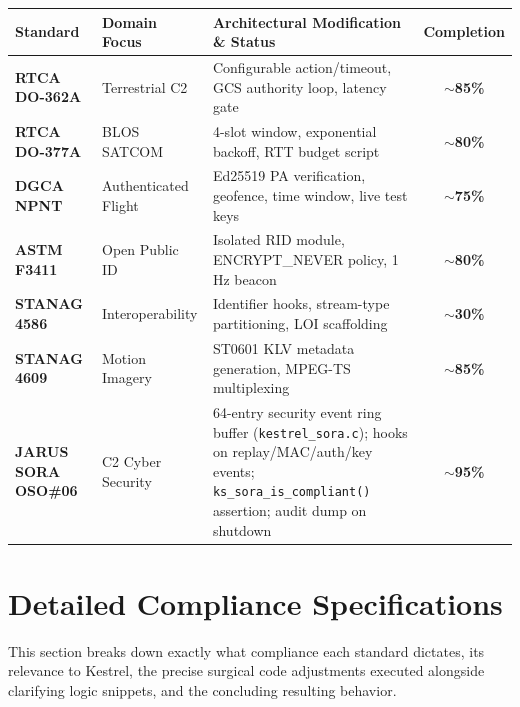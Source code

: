 \documentclass[11pt,a4paper]{article}
\begin{document}
\begin{table}[H]
	\centering
	\renewcommand{\arraystretch}{1.4}
	\begin{tabularx}{\textwidth}{@{} | l | l | X | c |@{}}
		\toprule
		\textbf{Standard} & \textbf{Domain Focus} & \textbf{Architectural Modification \& Status} & \textbf{Completion} \\
		\midrule
		\textbf{RTCA DO-362A} & Terrestrial C2 & Configurable action/timeout, GCS authority loop, latency gate & \textbf{$\sim$85\%} \\
		\hline
		\textbf{RTCA DO-377A} & BLOS SATCOM & 4-slot window, exponential backoff, RTT budget script & \textbf{$\sim$80\%} \\
		\hline
		\textbf{DGCA NPNT} & Authenticated Flight & Ed25519 PA verification, geofence, time window, live test keys & \textbf{$\sim$75\%} \\
		\hline
		\textbf{ASTM F3411} & Open Public ID & Isolated RID module, ENCRYPT\_NEVER policy, 1 Hz beacon & \textbf{$\sim$80\%} \\
		\hline
		\textbf{STANAG 4586} & Interoperability & Identifier hooks, stream-type partitioning, LOI scaffolding & \textbf{$\sim$30\%} \\
		\hline
		\textbf{STANAG 4609} & Motion Imagery & ST0601 KLV metadata generation, MPEG-TS multiplexing & \textbf{$\sim$85\%} \\
		\hline
		\textbf{JARUS SORA OSO\#06} & C2 Cyber Security & 64-entry security event ring buffer (\texttt{kestrel\_sora.c}); hooks on replay/MAC/auth/key events; \texttt{ks\_sora\_is\_compliant()} assertion; audit dump on shutdown & \textbf{$\sim$95\%} \\
		\bottomrule
	\end{tabularx}
\end{table}

\section{Detailed Compliance Specifications}

This section breaks down exactly what compliance each standard dictates, its relevance to Kestrel, the precise surgical code adjustments executed alongside clarifying logic snippets, and the concluding resulting behavior.
\end{document}
